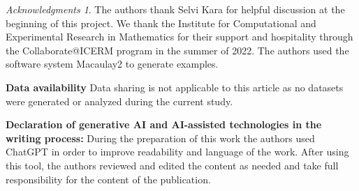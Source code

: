 \documentclass [12pt,a4paper,reqno]{amsart}
\theoremstyle{plain}
\theoremstyle{definition}
\newtheorem{Assumptions and Discussion}[Theorem]{Assumptions and Discussion}
\theoremstyle{remark}
\newtheorem*{acknowledgment*}{Acknowledgments}
\begin{document}
\begin{acknowledgment*}
The authors thank Selvi Kara for helpful discussion at the beginning of this project. We thank the Institute for Computational and Experimental Research in Mathematics for their support and hospitality through the Collaborate@ICERM program in the summer of 2022.  
The authors used the software system Macaulay2 \cite{M2} to generate examples.
\end{acknowledgment*}

\noindent
\textbf{Data availability} Data sharing is not applicable to this article as no datasets were generated or analyzed
during the current study.

\noindent\textbf{Declaration of generative AI and AI-assisted technologies in the writing process:}
During the preparation of this work the authors used ChatGPT in order to improve readability and language of the work. After using this tool, the authors reviewed and edited the content as needed and take full responsibility for the content of the publication.



\end{document}
